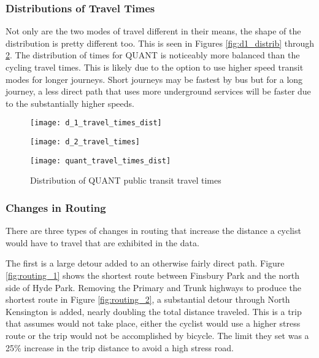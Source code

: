 \subsubsection{Distributions of Travel Times}

Not only are the two modes of travel different in their means, the shape of the distribution is pretty different too. This is seen in Figures \ref{fig:d1_distrib} through \ref{fig:quant_distrib}. The distribution of times for QUANT is noticeably more balanced than the cycling travel times. This is likely due to the option to use higher speed transit modes for longer journeys. Short journeys may be fastest by bus but for a long journey, a less direct path that uses more underground services will be faster due to the substantially higher speeds. 



\begin{figure}
\centering
\begin{minipage}{.5\textwidth}
  \centering
  \texttt{[image: d\_1\_travel\_times\_dist]}
  \label{fig:d1_distrib}
\end{minipage}%
\begin{minipage}{.5\textwidth}
  \centering
  \texttt{[image: d\_2\_travel\_times]}
  \label{fig:d2_distrib}
\end{minipage}
\end{figure}

\begin{figure}
\centering
\texttt{[image: quant\_travel\_times\_dist]}
\caption{Distribution of QUANT public transit travel times}
\label{fig:quant_distrib}
\end{figure}


\subsubsection{Changes in Routing} 

There are three types of changes in routing that increase the distance a cyclist would have to travel that are exhibited in the data. 

The first is a large detour added to an otherwise fairly direct path. Figure \ref{fig:routing_1} shows the shortest route between Finsbury Park and the north side of Hyde Park. Removing the Primary and Trunk highways to produce the shortest route in Figure \ref{fig:routing_2}, a substantial detour through North Kensington is added, nearly doubling the total distance traveled. This is a trip that \cite{furth2016network} assumes would not take place, either the cyclist would use a higher stress route or the trip would not be accomplished by bicycle. The limit they set was a 25\% increase in the trip distance to avoid a high stress road. 

